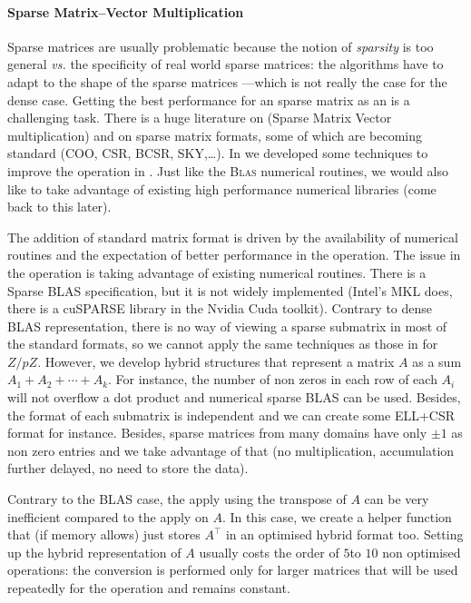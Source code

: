 \paragraph{Sparse Matrix--Vector Multiplication}
%
Sparse matrices are usually problematic because the notion of \emph{sparsity}
is too general \emph{vs.} the specificity of real world sparse matrices: the
algorithms have to adapt to the shape of the sparse matrices ---which is not
really the case for the dense case.
%
Getting the best performance for an sparse matrix as an \applin is a
challenging task. There is a huge literature on \spmv (Sparse Matrix Vector
multiplication) and on sparse matrix formats, some of which are becoming
standard (COO, CSR, BCSR, SKY,\ldots).  In \cite{Boyer:2010:spmv} we developed
some techniques to improve the \spmv operation in \linbox.
Just like the \textsc{Blas} numerical
routines, we would also like to take advantage of existing high performance
numerical libraries (come back to this later).
%
\par
%
The addition of standard matrix format is driven by the availability of
numerical routines and the expectation of better performance in the \spmv
operation.
The issue in the \spmv operation is taking advantage of existing numerical
routines. There is a Sparse BLAS specification, but it is not widely
implemented (Intel's MKL does, there is a cuSPARSE library in the Nvidia Cuda
toolkit). Contrary to dense BLAS representation, there is no way of viewing a
sparse submatrix in most of the standard formats, so we cannot apply the same
techniques as those in \fflas for $Z/pZ$. However, we develop hybrid structures
that represent a matrix $A$ as a sum $A_1 + A_2 + \cdots + A_k$. For instance,
the number of non zeros in each row of each $A_i$ will not overflow a dot
product and numerical sparse BLAS can be used. Besides, the format of each
submatrix is independent and we can create some ELL+CSR format for instance.
Besides, sparse matrices  from many domains have only $\pm1$ as non zero
entries and we take advantage of that (no multiplication, accumulation further
delayed, no need to store the data).
%
\par
%
Contrary to the BLAS case, the apply using the transpose of $A$ can be very
inefficient compared to the apply on $A$. In this case, we create a helper
function that (if memory allows) just stores $A^\top$ in an optimised hybrid
format too. Setting up the hybrid representation of $A$ usually costs the order
of $5$to $10$ non optimised \spmv operations: the conversion is performed only
for larger matrices that will be used repeatedly for the \spmv operation and
remains constant.
